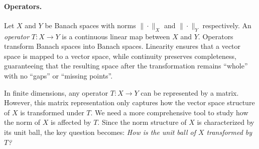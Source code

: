 

\paragraph*{Operators.} Let $X$ and $Y$ be Banach spaces with norms $\|\cdot\|_X$ and $\|\cdot\|_Y$ respectively. An \emph{operator} $T: X \rightarrow Y$ is a continuous linear map between $X$ and $Y$. Operators transform Banach spaces into Banach spaces. Linearity ensures that a vector space is mapped to a vector space, while continuity preserves completeness, guaranteeing that the resulting space after the transformation remains ``whole'' with no ``gaps'' or ``missing points''.

In finite dimensions, any operator $T: X \rightarrow Y$ can be represented by a matrix. However, this matrix representation only captures how the vector space structure of $X$ is transformed under $T$. We need a more comprehensive tool to study how the norm of $X$ is affected by $T$. Since the norm structure of $X$ is characterized by its unit ball, the key question becomes: \emph{How is the unit ball of $X$ transformed by $T$?}

